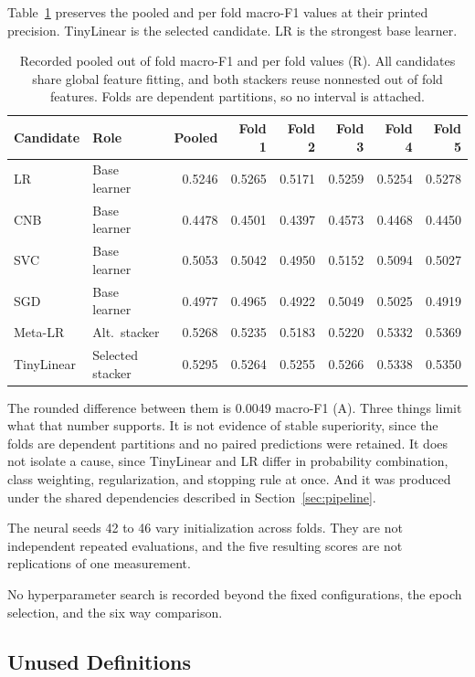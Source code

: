 \documentclass[runningheads]{llncs}
\begin{document}
Table~\ref{tab:results} preserves the pooled and per fold macro-F1 values at their printed precision. TinyLinear is the selected candidate. LR is the strongest base learner.

\begin{table}[t]
\centering
\caption{Recorded pooled out of fold macro-F1 and per fold values (R). All candidates share global feature fitting, and both stackers reuse nonnested out of fold features. Folds are dependent partitions, so no interval is attached.}
\label{tab:results}
\begin{tabular}{llrrrrrr}
\toprule
Candidate & Role & Pooled & Fold 1 & Fold 2 & Fold 3 & Fold 4 & Fold 5 \\
\midrule
LR & Base learner & 0.5246 & 0.5265 & 0.5171 & 0.5259 & 0.5254 & 0.5278 \\
CNB & Base learner & 0.4478 & 0.4501 & 0.4397 & 0.4573 & 0.4468 & 0.4450 \\
SVC & Base learner & 0.5053 & 0.5042 & 0.4950 & 0.5152 & 0.5094 & 0.5027 \\
SGD & Base learner & 0.4977 & 0.4965 & 0.4922 & 0.5049 & 0.5025 & 0.4919 \\
Meta-LR & Alt.\ stacker & 0.5268 & 0.5235 & 0.5183 & 0.5220 & 0.5332 & 0.5369 \\
TinyLinear & Selected stacker & 0.5295 & 0.5264 & 0.5255 & 0.5266 & 0.5338 & 0.5350 \\
\bottomrule
\end{tabular}
\end{table}

The rounded difference between them is 0.0049 macro-F1 (A). Three things limit what that number supports. It is not evidence of stable superiority, since the folds are dependent partitions and no paired predictions were retained. It does not isolate a cause, since TinyLinear and LR differ in probability combination, class weighting, regularization, and stopping rule at once. And it was produced under the shared dependencies described in Section~\ref{sec:pipeline}.

The neural seeds 42 to 46 vary initialization across folds. They are not independent repeated evaluations, and the five resulting scores are not replications of one measurement.

No hyperparameter search is recorded beyond the fixed configurations, the epoch selection, and the six way comparison.

\subsection{Unused Definitions}
\end{document}
